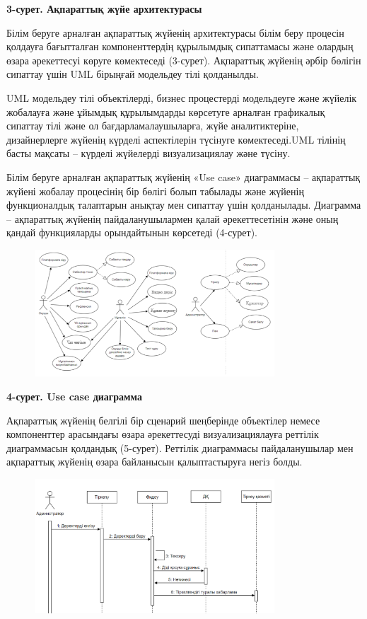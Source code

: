 {\bfseries 3-сурет. Ақпараттық жүйе архитектурасы}

Білім беруге арналған ақпараттық жүйенің архитектурасы білім беру
процесін қолдауға бағытталған компоненттердің құрылымдық сипаттамасы
және олардың өзара әрекеттесуі көруге көмектеседі (3-сурет). Ақпараттық
жүйенің әрбір бөлігін сипаттау үшін UML бірыңғай модельдеу тілі
қолданылды.

UML модельдеу тілі объектілерді, бизнес процестерді модельдеуге және
жүйелік жобалауға және ұйымдық құрылымдарды көрсетуге арналған
графикалық сипаттау тілі және ол бағдарламалаушыларға, жүйе
аналитиктеріне, дизайнерлерге жүйенің күрделі аспектілерін түсінуге
көмектеседі.UML тілінің басты мақсаты -- күрделі жүйелерді
визуализациялау және түсіну.

Білім беруге арналған ақпараттық жүйенің «Use case» диаграммасы --
ақпараттық жүйені жобалау процесінің бір бөлігі болып табылады және
жүйенің функционалдық талаптарын анықтау мен сипаттау үшін қолданылады.
Диаграмма -- ақпараттық жүйенің пайдаланушылармен қалай әрекеттесетінін
және оның қандай функцияларды орындайтынын көрсетеді (4-сурет).

\begin{figure}[H]
	\centering
	\includegraphics[width=0.8\textwidth]{media/ict/image102}
	\caption*{}
\end{figure}


{\bfseries 4-сурет. Use case диаграмма}

Ақпараттық жүйенің белгілі бір сценарий шеңберінде объектілер немесе
компоненттер арасындағы өзара әрекеттесуді визуализациялауға реттілік
диаграммасын қолдандық (5-сурет). Реттілік диаграммасы пайдаланушылар
мен ақпараттық жүйенің өзара байланысын қалыптастыруға негіз болды.

\begin{figure}[H]
	\centering
	\includegraphics[width=0.8\textwidth]{media/ict/image103}
	\caption*{}
\end{figure}


